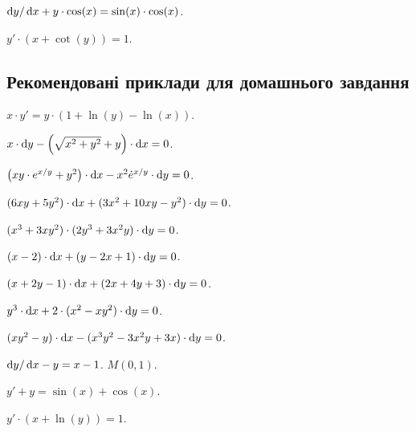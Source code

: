 \begin{problem}
	$\mathop{}\!\mathrm{d} y / \mathop{}\!\mathrm{d} x + y \cdot \cos (x) = \sin (x) \cdot \cos (x)$.
\end{problem}

\begin{problem}
	$y' \cdot (x + \cot (y)) = 1$.
\end{problem}

\subsection*{Рекомендовані приклади для домашнього завдання}

\begin{problem}
	$x \cdot y' = y \cdot (1 + \ln (y) - \ln (x))$.
\end{problem}

\begin{problem}
	$x \cdot \mathop{}\!\mathrm{d} y - \left( \sqrt{x^2 + y^2} + y \right) \cdot \mathop{}\!\mathrm{d} x = 0$.
\end{problem}

\begin{problem}
	$\left( x y \cdot e^{x / y} + y^2 \right) \cdot \mathop{}\!\mathrm{d} x - x^2 \dot e^{x / y} \cdot \mathop{}\!\mathrm{d} y = 0$.
\end{problem}

\begin{problem}
	$(6 x y + 5 y^2) \cdot \mathop{}\!\mathrm{d} x + (3 x^2 + 10 x y - y^2) \cdot \mathop{}\!\mathrm{d} y = 0$.
\end{problem}

\begin{problem}
	$(x^3 + 3 x y^2) \cdot (2 y^3 + 3 x^2 y) \cdot \mathop{}\!\mathrm{d} y = 0$.
\end{problem}

\begin{problem}
	$(x - 2) \cdot \mathop{}\!\mathrm{d} x + (y - 2 x + 1) \cdot \mathop{}\!\mathrm{d} y = 0$.
\end{problem}

\begin{problem}
	$(x + 2 y - 1) \cdot \mathop{}\!\mathrm{d} x + (2 x + 4 y + 3) \cdot \mathop{}\!\mathrm{d} y = 0$.
\end{problem}

\begin{problem}
	$y^3 \cdot \mathop{}\!\mathrm{d} x + 2 \cdot (x^2 - x y^2) \cdot \mathop{}\!\mathrm{d} y = 0$.
\end{problem}

\begin{problem}
	$(x y^2 - y) \cdot \mathop{}\!\mathrm{d} x - (x^3 y^2 - 3 x^2 y + 3 x) \cdot \mathop{}\!\mathrm{d} y = 0$.
\end{problem}

\begin{problem}
	$\mathop{}\!\mathrm{d} y / \mathop{}\!\mathrm{d} x - y = x - 1$.  $M(0,1)$.
\end{problem}

\begin{problem}
	$y' + y = \sin (x) + \cos (x)$.
\end{problem}

\begin{problem}
	$y' \cdot (x + \ln (y)) = 1$.
\end{problem}
